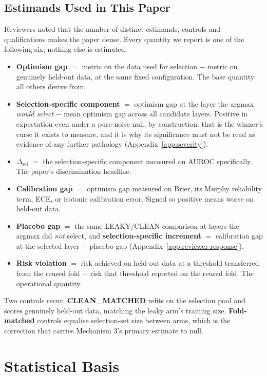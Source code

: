 \documentclass{article}
\begin{document}
\subsection{Estimands Used in This Paper}
\label{app:estimands}

Reviewers noted that the number of distinct estimands, controls and
qualifications makes the paper dense. Every quantity we report is one of the
following six; nothing else is estimated.

\begin{itemize}
\itemsep0pt
\item \textbf{Optimism gap} $=$ metric on the data used for selection $-$
  metric on genuinely held-out data, at the same fixed configuration. The base
  quantity all others derive from.
\item \textbf{Selection-specific component} $=$ optimism gap at the layer the
  argmax \emph{would select} $-$ mean optimism gap across all candidate
  layers. Positive in expectation even under a pure-noise null, by
  construction: that is the winner's curse it exists to measure, and it is why
  its significance must not be read as evidence of any further pathology
  (Appendix~\ref{app:severity}).
\item $\Delta_{\text{sel}}$ $=$ the selection-specific component measured on
  AUROC specifically. The paper's discrimination headline.
\item \textbf{Calibration gap} $=$ optimism gap measured on Brier, its Murphy
  reliability term, ECE, or isotonic calibration error. Signed so positive means
  worse on held-out data.
\item \textbf{Placebo gap} $=$ the same LEAKY/CLEAN comparison at layers the
  argmax did \emph{not} select, and \textbf{selection-specific increment} $=$
  calibration gap at the selected layer $-$ placebo gap
  (Appendix~\ref{app:reviewer-response}).
\item \textbf{Risk violation} $=$ risk achieved on held-out data at a
  threshold transferred from the reused fold $-$ risk that threshold reported
  on the reused fold. The operational quantity.
\end{itemize}

Two controls recur. \textbf{CLEAN\_MATCHED} refits on the selection pool and
scores genuinely held-out data, matching the leaky arm's training size.
\textbf{Fold-matched} controls equalise selection-set size between arms, which
is the correction that carries Mechanism 3's primary estimate to null.

\section{Statistical Basis}
\end{document}
